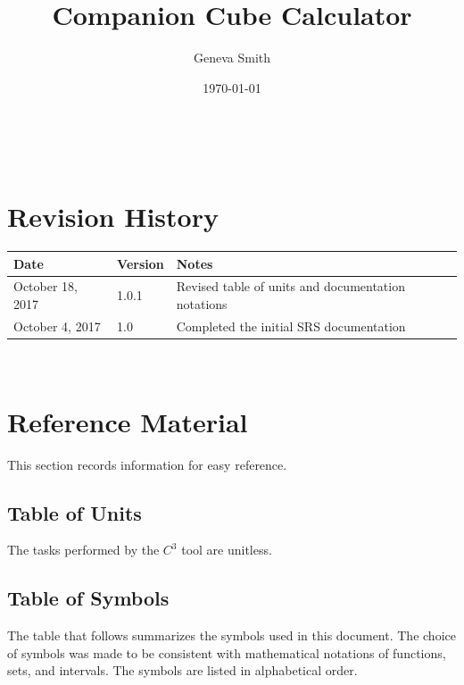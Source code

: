 \documentclass[12pt]{article}
\newcommand{\prognameAbbrv}{$C^{3}$}
\begin{document}
\title{Companion Cube Calculator} 
\author{Geneva Smith}
\date{\today}
	
\maketitle

~\newpage


\section{Revision History}

\begin{tabularx}{\textwidth}{p{3cm}p{2cm}X}
\toprule {\bf Date} & {\bf Version} & {\bf Notes}\\
\midrule
October 18, 2017 & 1.0.1 & Revised table of units and documentation notations \\
October 4, 2017 & 1.0 & Completed the initial SRS documentation\\
\bottomrule
\end{tabularx}

~\newpage

\section{Reference Material}

This section records information for easy reference.

\subsection{Table of Units}

The tasks performed by the \prognameAbbrv{} tool are unitless.

\subsection{Table of Symbols}

The table that follows summarizes the symbols used in this document. The choice 
of symbols was made to be consistent with mathematical notations of functions, 
sets, and intervals. The symbols are listed in alphabetical order.
\end{document}
